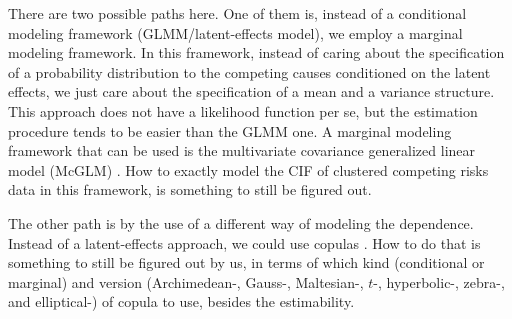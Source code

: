 There are two possible paths here. One of them is, instead of a
conditional modeling framework (GLMM/latent-effects model), we employ a
marginal modeling framework. In this framework, instead of caring
about the specification of a probability distribution to the competing
causes conditioned on the latent effects, we just care about the
specification of a mean and a variance structure. This approach does not
have a likelihood function per se, but the estimation procedure tends to
be easier than the GLMM one. A marginal modeling framework that can be
used is the multivariate covariance generalized linear model (McGLM)
\cite{mcglm, rmcglm}. How to exactly model the CIF of clustered
competing risks data in this framework, is something to still be figured
out.

The other path is by the use of a different way of modeling the
dependence. Instead of a latent-effects approach, we could use copulas
\cite{factorcopulas, cheng&fine12, semiparametricSCHEIKE, copulas}.
How to do that is something to still be figured out by us, in terms of
which kind (conditional or marginal) and version (Archimedean-, Gauss-,
Maltesian-, \(t\)-, hyperbolic-, zebra-, and elliptical-) of copula to
use, besides the estimability.


